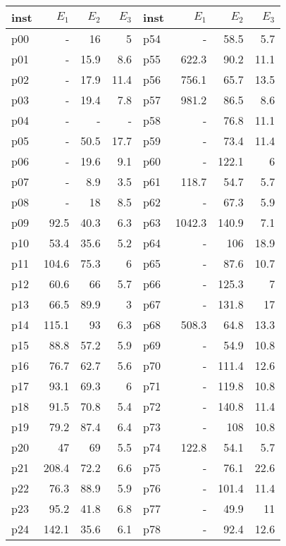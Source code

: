 \begin{tabular}{ | l | r | r | r || l | r | r | r | }
  \hline                        
  inst	&$E_1$	&$E_2$	&$E_3$	&inst	&$E_1$	&$E_2$	&$E_3$ \\
  \hline                       
p00	&-	&16	&5	&p54	&-	&58.5	&5.7\\
p01	&-	&15.9	&8.6	&p55	&622.3	&90.2	&11.1\\
p02	&-	&17.9	&11.4	&p56	&756.1	&65.7	&13.5\\
p03	&-	&19.4	&7.8	&p57	&981.2	&86.5	&8.6\\
p04	&-	&-	&-	&p58	&-	&76.8	&11.1\\
p05	&-	&50.5	&17.7	&p59	&-	&73.4	&11.4\\
p06	&-	&19.6	&9.1	&p60	&-	&122.1	&6\\
p07	&-	&8.9	&3.5	&p61	&118.7	&54.7	&5.7\\
p08	&-	&18	&8.5	&p62	&-	&67.3	&5.9\\
p09	&92.5	&40.3	&6.3	&p63	&1042.3	&140.9	&7.1\\
p10	&53.4	&35.6	&5.2	&p64	&-	&106	&18.9\\
p11	&104.6	&75.3	&6	&p65	&-	&87.6	&10.7\\
p12	&60.6	&66	&5.7	&p66	&-	&125.3	&7\\
p13	&66.5	&89.9	&3	&p67	&-	&131.8	&17\\
p14	&115.1	&93	&6.3	&p68	&508.3	&64.8	&13.3\\
p15	&88.8	&57.2	&5.9	&p69	&-	&54.9	&10.8\\
p16	&76.7	&62.7	&5.6	&p70	&-	&111.4	&12.6\\
p17	&93.1	&69.3	&6	&p71	&-	&119.8	&10.8\\
p18	&91.5	&70.8	&5.4	&p72	&-	&140.8	&11.4\\
p19	&79.2	&87.4	&6.4	&p73	&-	&108	&10.8\\
p20	&47	&69	&5.5	&p74	&122.8	&54.1	&5.7\\
p21	&208.4	&72.2	&6.6	&p75	&-	&76.1	&22.6\\
p22	&76.3	&88.9	&5.9	&p76	&-	&101.4	&11.4\\
p23	&95.2	&41.8	&6.8	&p77	&-	&49.9	&11\\
p24	&142.1	&35.6	&6.1	&p78	&-	&92.4	&12.6\\

\end{tabular}

